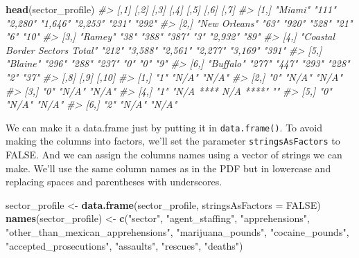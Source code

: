 \documentclass[
  12pt,
]{book}
\newenvironment{Shaded}{\begin{snugshade}}{\end{snugshade}}
\newcommand{\CommentTok}[1]{\textcolor[rgb]{0.37,0.37,0.37}{\textit{#1}}}
\newcommand{\DataTypeTok}[1]{\textcolor[rgb]{0.27,0.27,0.27}{#1}}
\newcommand{\KeywordTok}[1]{\textcolor[rgb]{0.27,0.27,0.27}{\textbf{#1}}}
\newcommand{\NormalTok}[1]{#1}
\newcommand{\OtherTok}[1]{\textcolor[rgb]{0.37,0.37,0.37}{#1}}
\newcommand{\StringTok}[1]{\textcolor[rgb]{0.5,0.5,0.5}{#1}}
\begin{document}
\begin{Shaded}
\begin{Highlighting}[]
\KeywordTok{head}\NormalTok{(sector\_profile)}
\CommentTok{\#\textgreater{}      [,1]                           [,2]  [,3]    [,4]    [,5]    [,6]    [,7] }
\CommentTok{\#\textgreater{} [1,] "Miami"                        "111" "2,280" "1,646" "2,253" "231"   "292"}
\CommentTok{\#\textgreater{} [2,] "New Orleans"                  "63"  "920"   "528"   "21"    "6"     "10" }
\CommentTok{\#\textgreater{} [3,] "Ramey"                        "38"  "388"   "387"   "3"     "2,932" "89" }
\CommentTok{\#\textgreater{} [4,] "Coastal Border Sectors Total" "212" "3,588" "2,561" "2,277" "3,169" "391"}
\CommentTok{\#\textgreater{} [5,] "Blaine"                       "296" "288"   "237"   "0"     "0"     "9"  }
\CommentTok{\#\textgreater{} [6,] "Buffalo"                      "277" "447"   "293"   "228"   "2"     "37" }
\CommentTok{\#\textgreater{}      [,8] [,9]                [,10]}
\CommentTok{\#\textgreater{} [1,] "1"  "N/A"               "N/A"}
\CommentTok{\#\textgreater{} [2,] "0"  "N/A"               "N/A"}
\CommentTok{\#\textgreater{} [3,] "0"  "N/A"               "N/A"}
\CommentTok{\#\textgreater{} [4,] "1"  "N/A **** N/A ****" ""   }
\CommentTok{\#\textgreater{} [5,] "0"  "N/A"               "N/A"}
\CommentTok{\#\textgreater{} [6,] "2"  "N/A"               "N/A"}
\end{Highlighting}
\end{Shaded}

We can make it a data.frame just by putting it in \texttt{data.frame()}. To avoid making the columns into factors, we'll set the parameter \texttt{stringsAsFactors} to FALSE. And we can assign the columns names using a vector of strings we can make. We'll use the same column names as in the PDF but in lowercase and replacing spaces and parentheses with underscores.

\begin{Shaded}
\begin{Highlighting}[]
\NormalTok{sector\_profile \textless{}{-}}\StringTok{ }\KeywordTok{data.frame}\NormalTok{(sector\_profile, }\DataTypeTok{stringsAsFactors =} \OtherTok{FALSE}\NormalTok{)}
\KeywordTok{names}\NormalTok{(sector\_profile) \textless{}{-}}\StringTok{ }\KeywordTok{c}\NormalTok{(}\StringTok{"sector"}\NormalTok{,}
                           \StringTok{"agent\_staffing"}\NormalTok{,}
                           \StringTok{"apprehensions"}\NormalTok{,}
                           \StringTok{"other\_than\_mexican\_apprehensions"}\NormalTok{, }
                           \StringTok{"marijuana\_pounds"}\NormalTok{,}
                           \StringTok{"cocaine\_pounds"}\NormalTok{,}
                           \StringTok{"accepted\_prosecutions"}\NormalTok{,}
                           \StringTok{"assaults"}\NormalTok{,}
                           \StringTok{"rescues"}\NormalTok{,}
                           \StringTok{"deaths"}\NormalTok{)}
\end{Highlighting}
\end{Shaded}
\end{document}
